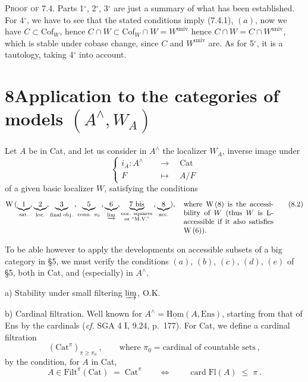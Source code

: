 \documentclass[11pt]{article}
\newcommand{\printedpage}[1]{\marginpar{\footnotesize p.~#1}}
\newcommand{\msp}[1]{\marginpar{\footnotesize [#1]}}
\newcommand{\Fl}{\mathrm{Fl}}
\newcommand{\Cof}{\mathrm{Cof}}
\newcommand{\Cat}{\mathrm{Cat}}
\newcommand{\univ}{\mathrm{univ}}
\newcommand{\chap}{^{\wedge}}
\begin{document}
\textsc{Proof of} 7.4. Parts 1$^\circ$, 2$^\circ$, 3$^\circ$ are just a summary of what has been established. For 4$^\circ$, we have to see that the stated conditions imply (7.4.1), $(a)$, now we have $C\subset \Cof_W$, hence $C\cap W\subset \Cof_W\cap W = W^{\univ}$
\msp{page 100}
hence $C\cap W = C\cap W^{\univ}$, which is stable under cobase change, since $C$ and $W^{\univ}$ are. As for 5$^\circ$, it is a tautology, taking 4$^\circ$ into account.

\section*{8\quad Application to the categories of models $(A\chap,W_A)$}

Let $A$ be in Cat, and let us consider in $A\chap$ the localizer $W_A$, inverse image under
\[
\left\{
\begin{aligned}
i_A : A\chap \quad &\longrightarrow \quad \Cat\\
F \quad &\longmapsto \quad A/F
\end{aligned}
\right.
\tag*{(8.1)}
\]
of a given basic localizer $W$, satisfying the conditions
\[
\mathrm{W}\,(\underbrace{1}_{\text{sat.}},\underbrace{2}_{\text{loc.}},\underbrace{3}_{\text{final obj.}}\,,\underbrace{5}_{\text{conn. }\pi_0}\,,\underbrace{6}_{\varinjlim},\underbrace{7\text{ bis}}_{\substack{\text{coc. squares}\\ \text{or ``M.V.''}}}\,,\underbrace{8}_{\text{acc.}}),\quad
\text{\parbox[t]{4.3cm}{where W\,(8) is the accessibility of $W$ (thus $W$ is L-accessible if it also satisfies W\,(6)).}}
\tag*{(8.2)}
\]

To be able however to apply the developments on accessible subsets of a big category in §5, we must verify the conditions $(a)$, $(b)$, $(c)$, $(d)$, $(e)$ of §5, both in Cat, and (especially) in $A\chap$.

a) Stability under small filtering $\varinjlim$, O.K.

b) Cardinal filtration. Well known for $A\chap = \underline{\mathrm{Hom}}(A,\mathrm{Ens})$, starting from that of Ens by the cardinals (\textit{cf.} SGA 4 I, 9.24, p.~177). For Cat, we define a cardinal filtration
\[
(\Cat^{\pi})_{\pi\geq\pi_0}\ , \qquad \text{where } \pi_0 = \text{cardinal of countable sets}\ ,
\tag*{(8.3)}
\]
\printedpage{56}
\msp{page 101}
by the condition, for $A$ in Cat,
\[
A\in \mathrm{Filt}^{\pi}(\Cat) \;=\; \Cat^{\pi} \qquad\Longleftrightarrow\qquad \operatorname{card}\Fl(A) \;\leq\; \pi\ .
\tag*{(8.4)}
\]
\end{document}
